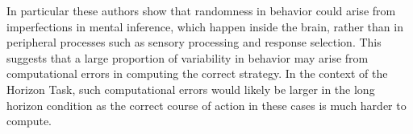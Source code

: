 \documentclass[12pt]{article}
\begin{document}
		 In particular these authors show that randomness in behavior could arise from imperfections in mental inference, which happen inside the brain, rather than in peripheral processes such as sensory processing and response selection. This suggests that a large proportion of variability in behavior may arise from computational errors in computing the correct strategy. In the context of the Horizon Task, such computational errors would likely be larger in the long horizon condition as the correct course of action in these cases is much harder to compute.	
		
		
		
		
\end{document}
